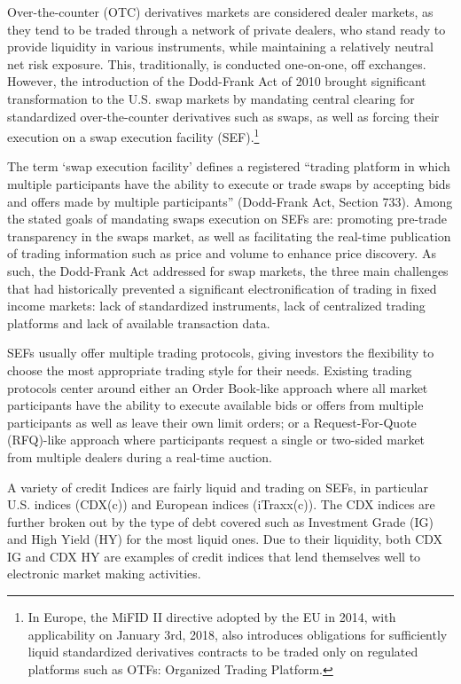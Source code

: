 Over-the-counter (OTC) derivatives markets are considered dealer markets, as they tend to be traded through a network of private dealers, who stand ready to provide liquidity in various instruments, while maintaining a relatively neutral net risk exposure. This, traditionally, is conducted one-on-one, off exchanges. However, the introduction of the Dodd-Frank Act of 2010 brought significant transformation to the U.S. swap markets by mandating central clearing for standardized over-the-counter derivatives such as swaps, as well as forcing their execution on a swap execution facility (SEF).\footnote{In Europe, the MiFID II directive adopted by the EU in 2014, with applicability on January 3rd, 2018, also introduces obligations for sufficiently liquid standardized derivatives contracts to be traded only on regulated platforms such as OTFs: Organized Trading Platform.}


The term `swap execution facility' defines a registered ``trading platform in which multiple participants have the ability to execute or trade swaps by accepting bids and offers made by multiple participants'' (Dodd-Frank Act, Section 733). Among the stated goals of mandating swaps execution on SEFs are: promoting pre-trade transparency in the swaps market, as well as facilitating the real-time publication of trading information such as price and volume to enhance price discovery. As such, the Dodd-Frank Act addressed for swap markets, the three main challenges that had historically prevented a significant electronification of trading in fixed income markets: lack of standardized instruments, lack of centralized trading platforms and lack of available transaction data.


SEFs usually offer multiple trading protocols, giving investors the flexibility to choose the most appropriate trading style for their needs. Existing trading protocols center around either an Order Book-like approach where all market participants have the ability to execute available bids or offers from multiple participants as well as leave their own limit orders; or a Request-For-Quote (RFQ)-like approach where participants request a single or two-sided market from multiple dealers during a real-time auction.


A variety of credit Indices are fairly liquid and trading on SEFs, in particular U.S. indices (CDX(c)) and European indices (iTraxx(c)). The CDX indices are further broken out by the type of debt covered such as Investment Grade (IG) and High Yield (HY) for the most liquid ones. Due to their liquidity, both CDX IG and CDX HY are examples of credit indices that lend themselves well to electronic market making activities.


